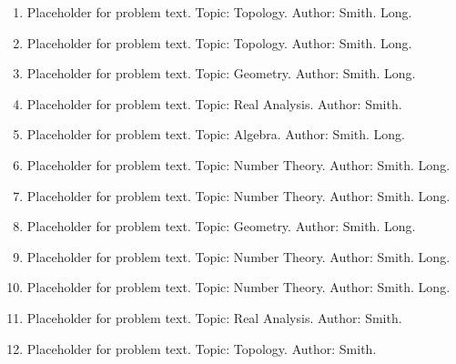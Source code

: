 \documentclass[12pt]{article}
\newcommand{\answer}[1]{} %
\newcommand{\topic}[1]{} %
\renewcommand{\author}[1]{} %
\newcommand{\isLong}[1]{} %
\begin{document}
\begin{enumerate}

\item Placeholder for problem text. Topic: Topology. Author: Smith. Long.
\answer{Answer here}
\topic{Topology}
\author{Smith}
\isLong{true}

\item Placeholder for problem text. Topic: Topology. Author: Smith. Long.
\answer{Answer here}
\topic{Topology}
\author{Smith}
\isLong{true}

\item Placeholder for problem text. Topic: Geometry. Author: Smith. Long.
\answer{Answer here}
\topic{Geometry}
\author{Smith}
\isLong{true}

\item Placeholder for problem text. Topic: Real Analysis. Author: Smith. 
\answer{Answer here}
\topic{Real Analysis}
\author{Smith}
\isLong{false}

\item Placeholder for problem text. Topic: Algebra. Author: Smith. Long.
\answer{Answer here}
\topic{Algebra}
\author{Smith}
\isLong{true}

\item Placeholder for problem text. Topic: Number Theory. Author: Smith. Long.
\answer{Answer here}
\topic{Number Theory}
\author{Smith}
\isLong{true}

\item Placeholder for problem text. Topic: Number Theory. Author: Smith. Long.
\answer{Answer here}
\topic{Number Theory}
\author{Smith}
\isLong{true}

\item Placeholder for problem text. Topic: Geometry. Author: Smith. Long.
\answer{Answer here}
\topic{Geometry}
\author{Smith}
\isLong{true}

\item Placeholder for problem text. Topic: Number Theory. Author: Smith. Long.
\answer{Answer here}
\topic{Number Theory}
\author{Smith}
\isLong{true}

\item Placeholder for problem text. Topic: Number Theory. Author: Smith. Long.
\answer{Answer here}
\topic{Number Theory}
\author{Smith}
\isLong{true}

\item Placeholder for problem text. Topic: Real Analysis. Author: Smith. 
\answer{Answer here}
\topic{Real Analysis}
\author{Smith}
\isLong{false}

\item Placeholder for problem text. Topic: Topology. Author: Smith. 
\answer{Answer here}
\topic{Topology}
\author{Smith}
\isLong{false}


\end{enumerate}
\end{document}
